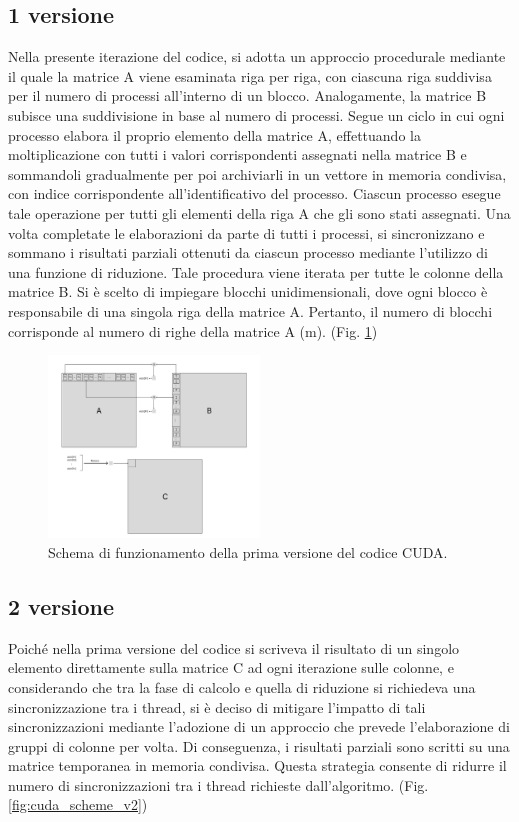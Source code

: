 \documentclass[conference]{IEEEtran}
\begin{document}
\subsection{1 versione}
Nella presente iterazione del codice, si adotta un approccio procedurale mediante il quale la matrice A viene esaminata riga per riga, con ciascuna riga suddivisa per il numero di processi all'interno di un blocco. Analogamente, la matrice B subisce una suddivisione in base al numero di processi. Segue un ciclo in cui ogni processo elabora il proprio elemento della matrice A, effettuando la moltiplicazione con tutti i valori corrispondenti assegnati nella matrice B e sommandoli gradualmente per poi archiviarli in un vettore in memoria condivisa, con indice corrispondente all'identificativo del processo. Ciascun processo esegue tale operazione per tutti gli elementi della riga A che gli sono stati assegnati. Una volta completate le elaborazioni da parte di tutti i processi, si sincronizzano e sommano i risultati parziali ottenuti da ciascun processo mediante l'utilizzo di una funzione di riduzione. Tale procedura viene iterata per tutte le colonne della matrice B. Si è scelto di impiegare blocchi unidimensionali, dove ogni blocco è responsabile di una singola riga della matrice A. Pertanto, il numero di blocchi corrisponde al numero di righe della matrice A (m). (Fig. \ref{fig:cuda_scheme_v1})
\begin{figure}[H]
    \centering
    \includegraphics[width=0.5\textwidth]{resources/cuda_scheme_v1.png}
    \caption{Schema di funzionamento della prima versione del codice CUDA.}
    \label{fig:cuda_scheme_v1}
\end{figure}

\subsection{2 versione}
Poiché nella prima versione del codice si scriveva il risultato di un singolo elemento direttamente sulla matrice C ad ogni iterazione sulle colonne, e considerando che tra la fase di calcolo e quella di riduzione si richiedeva una sincronizzazione tra i thread, si è deciso di mitigare l'impatto di tali sincronizzazioni mediante l'adozione di un approccio che prevede l'elaborazione di gruppi di colonne per volta. Di conseguenza, i risultati parziali sono scritti su una matrice temporanea in memoria condivisa. Questa strategia consente di ridurre il numero di sincronizzazioni tra i thread richieste dall'algoritmo. (Fig. \ref{fig:cuda_scheme_v2})
\end{document}
